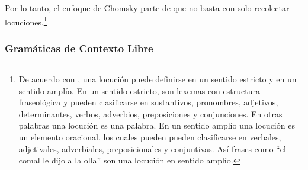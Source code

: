 Por lo tanto, el enfoque de Chomsky parte de que no basta con solo recolectar locuciones.\footnote{De acuerdo con \cite{orduna2011estudio}, una locución puede definirse en un sentido estricto y en un sentido amplío. En un sentido estricto, son lexemas con estructura fraseológica y pueden clasificarse en sustantivos, pronombres, adjetivos, determinantes, verbos, adverbios, preposiciones y conjunciones. En otras palabras una locución es una palabra. En un sentido amplío una locución es un elemento oracional, los cuales pueden pueden clasificarse en verbales, adjetivales, adverbiales, preposicionales y conjuntivas. Así frases como ``el comal le dijo a la olla'' son una locución en sentido amplío.} 

\subsubsection{Gramáticas de Contexto Libre}
\label{subsubsec:sec2112}

